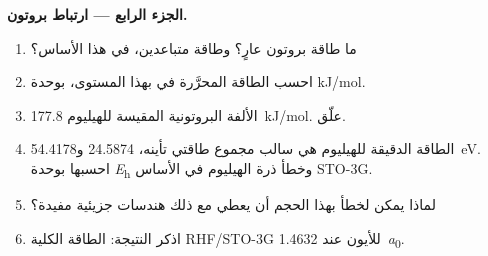 \begin{problem}
\medskip\noindent\textbf{الجزء الرابع --- ارتباط بروتون.}
\begin{enumerate}[resume]
  \item ما طاقة بروتون عارٍ؟ وطاقة  متباعدين، في هذا
        الأساس؟
  \item احسب الطاقة المحرَّرة في  بهذا المستوى، بوحدة
        \unit{kJ/mol}.
  \item الألفة البروتونية المقيسة للهيليوم \qty{177.8}{kJ/mol}.
        علّق.
  \item الطاقة الدقيقة للهيليوم هي سالب مجموع طاقتي تأينه،
        24.5874 و\qty{54.4178}{eV}. احسبها بوحدة \unit{\hartree} 
        وخطأ ذرة الهيليوم في الأساس STO-3G.
  \item لماذا يمكن لخطأ بهذا الحجم أن يعطي مع ذلك هندسات جزيئية
        مفيدة؟
  \item اذكر النتيجة: الطاقة الكلية RHF/STO-3G للأيون  عند
        \qty{1.4632}{\bohr}.
\end{enumerate}
\end{problem}
